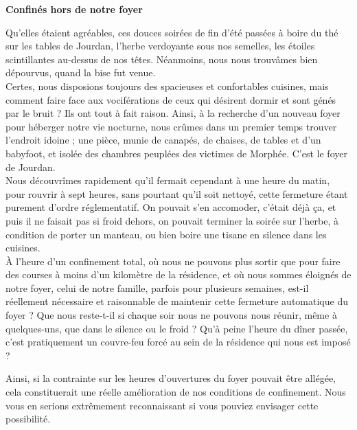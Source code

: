 \documentclass[french,12pt,amstex,a4paper]{article}
\begin{document}
\begin{center}
{\bf Confinés hors de notre foyer}\\
\end{center}

Qu'elles étaient agréables, ces douces soirées de fin d'été passées à boire du thé sur les tables de Jourdan, l'herbe verdoyante sous nos semelles, les étoiles scintillantes au-dessus de nos têtes. Néanmoins, nous nous trouvâmes bien dépourvus, quand la bise fut venue.\\

Certes, nous disposions toujours des spacieuses et confortables cuisines, mais comment faire face aux vociférations de ceux qui désirent dormir et sont génés par le bruit ? Ils ont tout à fait raison. Ainsi, à la recherche d'un nouveau foyer pour héberger notre vie nocturne, nous crûmes dans un premier temps trouver l'endroit idoine ; une pièce, munie de canapés, de chaises, de tables et d'un babyfoot, et isolée des chambres peuplées des victimes de Morphée. C'est le foyer de Jourdan.\\

Nous découvrîmes rapidement qu'il fermait cependant à une heure du matin, pour rouvrir à sept heures, sans pourtant qu'il soit nettoyé, cette fermeture étant purement d'ordre réglementatif. On pouvait s'en accomoder, c'était déjà ça, et puis il ne faisait pas si froid dehors, on pouvait terminer la soirée sur l'herbe, à condition de porter un manteau, ou bien boire une tisane en silence dans les cuisines.\\

À l'heure d'un confinement total, où nous ne pouvons plus sortir que pour faire des courses à moins d'un kilomètre de la résidence, et où nous sommes éloignés de notre foyer, celui de notre famille, parfois pour plusieurs semaines, est-il réellement nécessaire et raisonnable de maintenir cette fermeture automatique du foyer ? Que nous reste-t-il si chaque soir nous ne pouvons nous réunir, même à quelques-uns, que dans le silence ou le froid ? Qu'à peine l'heure du dîner passée, c'est pratiquement un couvre-feu forcé au sein de la résidence qui nous est imposé ?

Ainsi, si la contrainte sur les heures d'ouvertures du foyer pouvait être allégée, cela constituerait une réelle amélioration de nos conditions de confinement. Nous vous en serions extrêmement reconnaissant si vous pouviez envisager cette possibilité.
\end{document}
